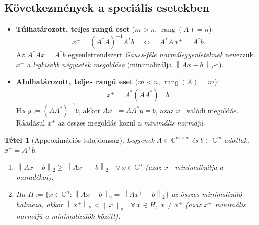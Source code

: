 \documentclass[a4paper,12pt]{article}
\theoremstyle{mydef}
\newtheorem{tetel}{Tétel}[section]
\newcommand{\C}{\mathbb{C}}
\newcommand{\norm}[1]{\left\|#1\right\|}
\DeclareMathOperator{\rang}{rang}
\begin{document}
\subsection*{Következmények a speciális esetekben}

\begin{itemize}
  \item \textbf{Túlhatározott, teljes rangú eset} ($m > n$, $\rang(A) = n$):
    \[
      x^+ = (A^*A)^{-1}A^*b \quad \Longleftrightarrow \quad A^*A\,x^+ = A^*b.
    \]
    Az $A^*Ax = A^*b$ egyenletrendszert \emph{Gauss-féle normálegyenleteknek} nevezzük.
    $x^+$ a \emph{legkisebb négyzetek megoldása} (minimalizálja $\norm{Ax - b}_2$-t).

  \item \textbf{Alulhatározott, teljes rangú eset} ($m < n$, $\rang(A) = m$):
    \[
      x^+ = A^*(AA^*)^{-1}b.
    \]
    Ha $y := (AA^*)^{-1}b$, akkor $Ax^+ = AA^*y = b$, azaz $x^+$ valódi megoldás.
    Ráadásul $x^+$ az összes megoldás közül a \emph{minimális normájú}.
\end{itemize}

\begin{mdframed}[backgroundcolor=thmbg,linewidth=0pt,innertopmargin=8pt,innerbottommargin=8pt]
\begin{tetel}[Approximációs tulajdonság]
\label{tetel:approx}
Legyenek $A \in \C^{m\times n}$ és $b \in \C^m$ adottak, $x^+ = A^+b$.
\begin{enumerate}[noitemsep,topsep=2pt]
  \item $\norm{Ax - b}_2 \ge \norm{Ax^+ - b}_2 \quad \forall\,x \in \C^n$
        (azaz $x^+$ minimalizálja a maradékot).
  \item Ha $H := \{x \in \C^n : \norm{Ax - b}_2 = \norm{Ax^+ - b}_2\}$ az összes
        minimalizáló halmaza, akkor
        $\norm{x^+}_2 < \norm{x}_2 \quad \forall\,x \in H,\; x \ne x^+$
        (azaz $x^+$ minimális normájú a minimalizálók között).
\end{enumerate}
\end{tetel}
\end{mdframed}
\end{document}
